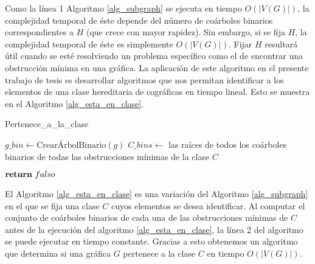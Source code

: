 Como la línea 1 Algoritmo \ref{alg_subgraph} se ejecuta en tiempo
$O(|V(G)|)$, la complejidad temporal de éste depende del número de coárboles
binarios correspondientes a $H$ (que crece con mayor rapidez). Sin embargo,
si se fija $H$, la complejidad temporal de éste es simplemente  $O(|V(G)|)$.
Fijar $H$ resultará útil cuando se esté resolviendo un problema específico
como el de encontrar una obstrucción mínima en una gráfica. La aplicación de
este algoritmo en el presente trabajo de tesis es desarrollar algoritmos que
nos permitan identificar a los elementos de una clase hereditaria de
cográficas en tiempo lineal. Esto se muestra en el Algoritmo
\ref{alg_esta_en_clase}.

\begin{algorithm}[ht!]
\caption{Pertenece_a_la_clase}
\label{alg_esta_en_clase}
\DontPrintSemicolon %

$g\_bin \gets \text{CrearÁrbolBinario}(g)$\;
$C\_bins \gets$ las raíces de todos los coárboles binarios de todas las obstrucciones mínimas de la clase $C$\;


$\Return\ falso$\;

\end{algorithm}

El Algoritmo \ref{alg_esta_en_clase} es una variación del Algoritmo
\ref{alg_subgraph} en el que se fija una clase $C$ cuyos elementos se desea
identificar. Al computar el conjunto de coárboles binarios de cada una de las
obstrucciones mínimas de $C$ antes de la ejecución del algoritmo
\ref{alg_esta_en_clase}, la línea 2 del algoritmo se puede ejecutar en tiempo
constante. Gracias a esto obtenemos un algoritmo que determina si una gráfica
$G$ pertenece a la clase $C$ en tiempo $O(|V(G)|)$.
